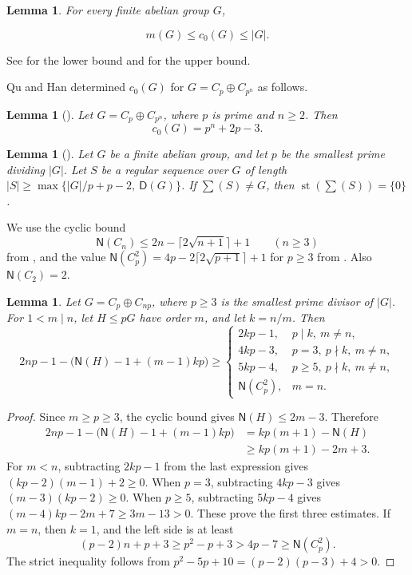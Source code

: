 \documentclass[10pt,a4paper]{amsart}
\newtheorem{lem}[thm]{Lemma}
\theoremstyle{definition}
\theoremstyle{remark}
\numberwithin{equation}{section}
\DeclareMathOperator{\st}{st}
\begin{document}
\begin{lem}\label{lem2.3}
	For every finite abelian group $G$,  
	
	$$m(G) \le c_0(G)\le |G|.$$
\end{lem}

See \cite[Lemma~2.3]{[GQZ2020]} for the lower bound and
\cite[Lemma~2.4]{[GHQQZ2015]} for the upper bound.

Qu and Han determined $c_0(G)$ for $G=C_p\oplus C_{p^n}$ as follows.

\begin{lem}[\cite{[QH2017]}]\label{lem2.4}
	Let $G=C_p\oplus C_{p^n}$, where $p$ is prime and $n\ge2$. Then
	$$c_0(G)=p^n+2p-3.$$
\end{lem}

\begin{lem}[{\cite[Lemma~2.3(1)]{[GHQQZ2015]}}]\label{lem5.2}
	Let $G$ be a finite abelian group, and let $p$ be the smallest prime dividing $|G|$. Let $S$ be a regular sequence over $G$ of length $|S|\ge \max \{|G|/p+p-2,~ \mathsf D(G)\}$. If $\sum (S)\ne G$, then $\st(\sum (S)) = \{0\}$.
\end{lem}

We use the cyclic bound
\[
\mathsf N(C_n)\le 2n-\lceil2\sqrt{n+1}\rceil+1\qquad(n\ge3)
\]
from \cite[Theorem~1.1]{[JY2024]}, and the value
$\mathsf N(C_p^2)=4p-2\lceil2\sqrt{p+1}\rceil+1$ for $p\ge3$
from \cite[Theorem~1.3(3)]{[GHHLYZ2022-2]}.
Also $\mathsf N(C_2)=2$.

\begin{lem}\label{lem2.7}
Let $G=C_p\oplus C_{np}$, where $p\ge3$ is the smallest prime divisor
of $|G|$. For $1<m\mid n$, let $H\le pG$ have order $m$, and let $k=n/m$.
Then
\[
2np-1-\bigl(\mathsf{N}(H)-1+(m-1)kp\bigr)\ge
\begin{cases}
2kp-1,&p\mid k,\ m\ne n,\\
4kp-3,&p=3,\ p\nmid k,\ m\ne n,\\
5kp-4,&p\ge5,\ p\nmid k,\ m\ne n,\\
\mathsf{N}(C_p^2),&m=n.
\end{cases}
\]
\end{lem}
\begin{proof}
Since $m\ge p\ge3$, the cyclic bound gives $\mathsf N(H)\le2m-3$.
Therefore
\[
\begin{aligned}
2np-1-\bigl(\mathsf N(H)-1+(m-1)kp\bigr)
&=kp(m+1)-\mathsf N(H)\\
&\ge kp(m+1)-2m+3.
\end{aligned}
\]
For $m<n$, subtracting $2kp-1$ from the last expression gives
$(kp-2)(m-1)+2\ge0$.
When $p=3$, subtracting $4kp-3$ gives $(m-3)(kp-2)\ge0$.
When $p\ge5$, subtracting $5kp-4$ gives
$(m-4)kp-2m+7\ge3m-13>0$.
These prove the first three estimates.
If $m=n$, then $k=1$, and the left side is at least
\[
(p-2)n+p+3\ge p^2-p+3>4p-7\ge\mathsf N(C_p^2).
\]
The strict inequality follows from
$p^2-5p+10=(p-2)(p-3)+4>0$.
\end{proof}
\end{document}

